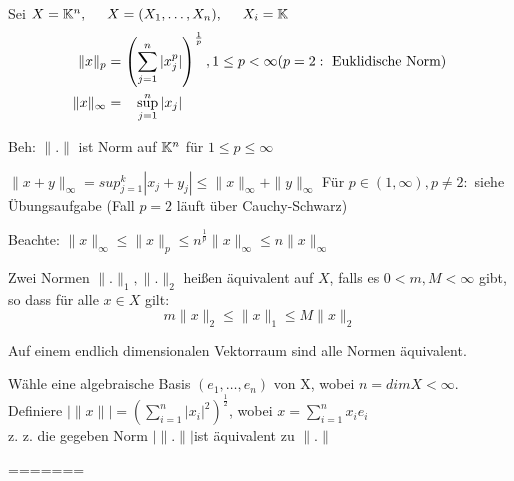 \begin{beispiel}
Sei $ X = \mathbb{K}^{n}, \hspace{0.5cm} X = ( X_{1}, \dotsc, X_{n}), \hspace{0.5cm} X_{i} = \mathbb{K}$ 
\begin{align*}
	\| x \|_{p} & = \left( \sum_{j = 1}^{n} |x_{j}^{p}| \right)^{\frac{1}{p}},  1 \leq p < \infty (p = 2: \text{ Euklidische Norm}) \\
	\| x \|_{\infty} & = \hspace{0.3cm} \sup_{j = 1}^{n} |x_{j}|	
\end{align*}

Beh: $\| . \| $ ist Norm auf $\mathbb{K}^n$ für $1 \leq p \leq \infty$

$\| x + y \|_{\infty} = sup_{j = 1}^{k} |x_{j} + y_{j}| \leq \|x\|_{\infty} + \|y\|_{\infty} $
Für $p \in (1, \infty), p \neq 2:$ siehe Übungsaufgabe (Fall $p = 2$ läuft über Cauchy-Schwarz)

Beachte: $\|x\|_{\infty} \leq  \|x\|_{p} \leq n^{\frac{1}{p}} \|x\|_{\infty} \leq n \| x \|_{\infty}$
\end{beispiel}

\begin{definition}
	Zwei Normen $\| . \|_{1}, \| . \|_{2}$ heißen äquivalent auf $X$, falls es $0 < m, M < \infty$ gibt, so dass für alle $ x \in X$ gilt:
	\[ m \| x \|_{2} \leq \| x \|_{1} \leq M \| x \|_{2} \]
\end{definition}
 
\begin{satz}
	Auf einem endlich dimensionalen Vektorraum sind alle Normen äquivalent.
\end{satz}
\begin{beweis}
	Wähle eine algebraische Basis $(e_{1}, \dotsc, e_{n})$ von X, wobei $ n = dim X < \infty$. \\
	Definiere $|\|x\|| = \left(\sum_{i = 1}^{n} |x_{i}|^2\right)^{\frac{1}{2}}$, wobei $x = \sum_{i = 1}^{n} x_{i} e_{i}$ \\
	
	z. z. die gegeben Norm $|\| . \||$ist äquivalent zu $\| . \|$ 
\end{beweis}







=======

